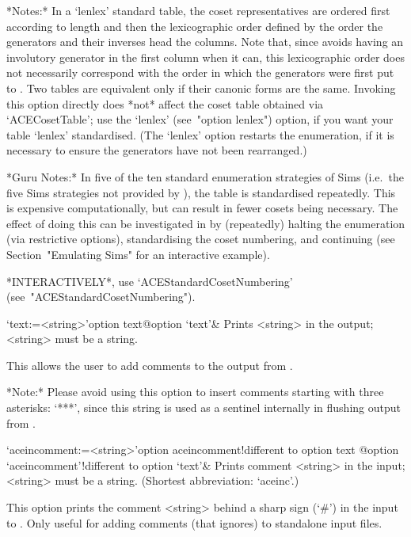 *Notes:*
In a `lenlex' standard table, the coset  representatives  are  ordered
first according to length and then the lexicographic order defined  by
the order the generators and their inverses  head  the  columns.  Note
that, since {\ACE} avoids having an involutory generator in the  first
column when it can, this  lexicographic  order  does  not  necessarily
correspond with the order in which the generators were  first  put  to
{\ACE}. Two tables are equivalent only if their canonic forms are  the
same. Invoking this option directly does *not* affect the {\GAP} coset
table obtained via  `ACECosetTable';  use  the  `lenlex'  (see~"option
lenlex") option, if you want your table  `lenlex'  standardised.  (The
`lenlex' option restarts the enumeration, if it is necessary to ensure
the generators have not been rearranged.)

*Guru Notes:*
In  five  of  the  ten  standard  enumeration   strategies   of   Sims
\cite{Sim94} (i.e.~the five Sims strategies not provided  by  {\ACE}),
the   table   is   standardised   repeatedly.   This   is    expensive
computationally, but can result in fewer cosets being  necessary.  The
effect of doing this can be investigated  in  {\ACE}  by  (repeatedly)
halting the enumeration (via restrictive options),  standardising  the
coset numbering, and continuing (see Section~"Emulating Sims"  for  an
interactive example).

*INTERACTIVELY*,            use            `ACEStandardCosetNumbering'
(see~"ACEStandardCosetNumbering").

\enditems


\beginitems

\>`text:=<string>'{option text}@{option `text'}&
Prints <string> in the output; <string> must be a string.

This allows the user to add comments to the output from {\ACE}.

*Note:*
Please avoid using this option to insert comments starting with  three
asterisks: `***', since this string is used as a  sentinel  internally
in flushing output from {\ACE}.

\>`aceincomment:=<string>'{option aceincomment!different to option text}%
@{option `aceincomment'!different to option `text'}&
Prints comment <string> in the {\ACE} input; <string> must be a string.
(Shortest abbreviation: `aceinc'.)

This option prints the comment <string> behind a sharp sign (`\#')  in
the input to {\ACE}. Only useful  for  adding  comments  (that  {\ACE}
ignores) to standalone input files.

\enditems

